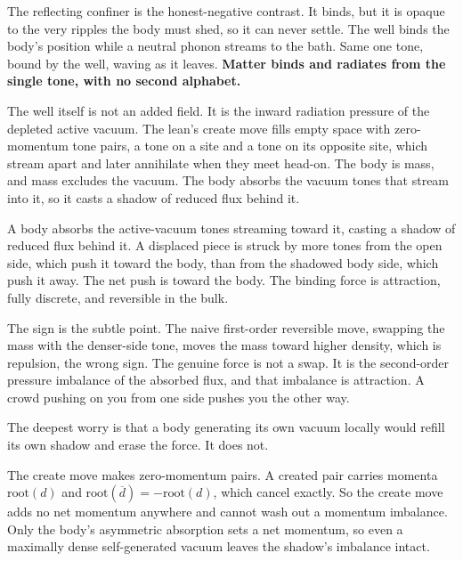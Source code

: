 The reflecting confiner is the honest-negative contrast. It binds, but it is opaque to the very ripples the body
must shed, so it can never settle. The well binds the body's position while a neutral phonon streams to the bath.
Same one tone, bound by the well, waving as it leaves. \textbf{Matter binds and radiates from the single tone,
with no second alphabet.}

The well itself is not an added field. It is the inward radiation pressure of the depleted active vacuum. The
lean's create move fills empty space with zero-momentum tone pairs, a tone on a site and a tone on its opposite
site, which stream apart and later annihilate when they meet head-on. The body is mass, and mass excludes the
vacuum. The body absorbs the vacuum tones that stream into it, so it casts a shadow of reduced flux behind it.

\begin{theorem}
A body absorbs the active-vacuum tones streaming toward it, casting a shadow of reduced flux behind it. A
displaced piece is struck by more tones from the open side, which push it toward the body, than from the shadowed
body side, which push it away. The net push is toward the body. The binding force is attraction, fully discrete,
and reversible in the bulk.
\end{theorem}

The sign is the subtle point. The naive first-order reversible move, swapping the mass with the denser-side tone,
moves the mass toward higher density, which is repulsion, the wrong sign. The genuine force is not a swap. It is
the second-order pressure imbalance of the absorbed flux, and that imbalance is attraction. A crowd pushing on you
from one side pushes you the other way.

The deepest worry is that a body generating its own vacuum locally would refill its own shadow and erase the
force. It does not.

\begin{result}
The create move makes zero-momentum pairs. A created pair carries momenta $\mathrm{root}(d)$ and
$\mathrm{root}(\overline{d}) = -\mathrm{root}(d)$, which cancel exactly. So the create move adds no net momentum
anywhere and cannot wash out a momentum imbalance. Only the body's asymmetric absorption sets a net momentum, so
even a maximally dense self-generated vacuum leaves the shadow's imbalance intact.
\end{result}

